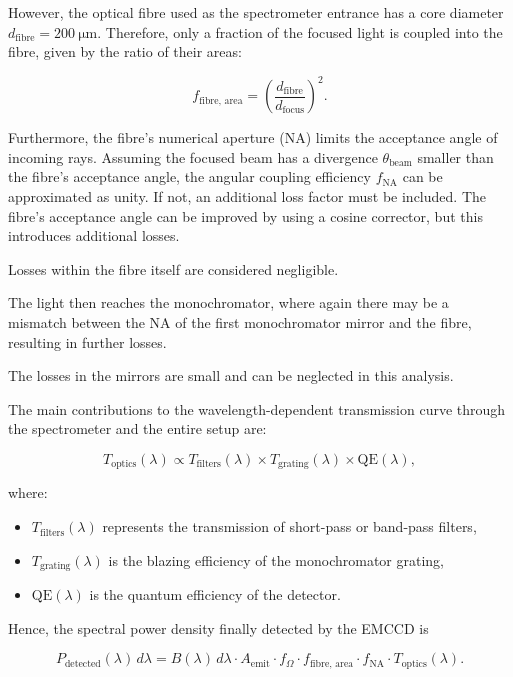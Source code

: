 \documentclass[
	parskip=half,
	a4paper,
]{scrarticle}
\begin{document}
However, the optical fibre used as the spectrometer entrance has a core diameter $d_\text{fibre} = \SI{200}{\micro\meter}$. Therefore, only a fraction of the focused light is coupled into the fibre, given by the ratio of their areas:

\begin{equation}
    f_\text{fibre, area}
    =
    \left( \frac{d_\text{fibre}}{d_\text{focus}} \right)^2.
\end{equation}

Furthermore, the fibre's numerical aperture (NA) limits the acceptance angle of incoming rays. Assuming the focused beam has a divergence $\theta_\text{beam}$ smaller than the fibre's acceptance angle, the angular coupling efficiency $f_\text{NA}$ can be approximated as unity. If not, an additional loss factor must be included. The fibre's acceptance angle can be improved by using a cosine corrector, but this introduces additional losses.

Losses within the fibre itself are considered negligible.

The light then reaches the monochromator, where again there may be a mismatch between the NA of the first monochromator mirror and the fibre, resulting in further losses.

The losses in the mirrors are small and can be neglected in this analysis.

The main contributions to the wavelength-dependent transmission curve through the spectrometer and the entire setup are:

\begin{equation}
    T_\text{optics}(\lambda) 
    \propto T_\text{filters}(\lambda)
    \times T_\text{grating}(\lambda)
    \times \text{QE}(\lambda),
\end{equation}

where:

\begin{itemize}
    \item $T_\text{filters}(\lambda)$ represents the transmission of short-pass or band-pass filters,
    \item $T_\text{grating}(\lambda)$ is the blazing efficiency of the monochromator grating,
    \item $\text{QE}(\lambda)$ is the quantum efficiency of the detector.
\end{itemize}

Hence, the spectral power density finally detected by the EMCCD is

\begin{equation}
    P_\text{detected}(\lambda)\, d\lambda
    = B(\lambda)\, d\lambda \cdot A_\text{emit} \cdot f_\Omega 
      \cdot f_\text{fibre, area} 
      \cdot f_\text{NA}
      \cdot T_\text{optics}(\lambda).
\end{equation}
\end{document}
